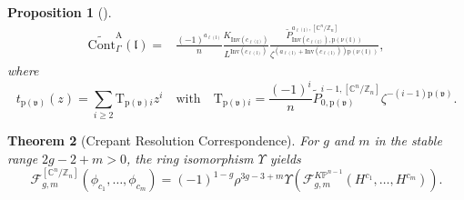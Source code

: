 \documentclass[12pt]{amsart}
\newtheorem{prop}{Proposition}[section]
\newtheorem{thm}[prop]{Theorem}
\numberwithin{equation}{section}
\newcommand{\CnZn}{[\mathbb{C}^n/\mathbb{Z}_n]}
\newcommand{\KP}{K\mathbb{P}}
\begin{document}
\begin{prop}[\cite{gt}]
\begin{equation*}
\begin{split}
    \widetilde{\mathrm{Cont}}_{\Gamma}^{\mathrm{A}}(\mathfrak{l})
    =&\frac{(-1)^{a_{\ell(\mathfrak{l})}}}{n}\frac{K_{\mathrm{Inv}(c_{\ell(\mathfrak{l})})}}{L^{\mathrm{Inv}(c_{\ell(\mathfrak{l})})}}
    \frac{\widetilde{P}_{\mathrm{Inv}(c_{\ell(\mathfrak{l})}),\mathrm{p}(\nu(\mathfrak{l}))}^{a_{\ell(\mathfrak{l})},\CnZn}}{     \zeta^{({a_{\ell(\mathfrak{l})}}+{\mathrm{Inv}(c_{\ell(\mathfrak{l})})})\mathrm{p}(\nu(\mathfrak{l}))}},
\end{split}
\end{equation*}
where
\begin{equation*}
t_{\mathrm{p}(\mathfrak{v})}(z)=\sum_{i\geq{2}}\mathrm{T}_{\mathrm{p}(\mathfrak{v})i}z^i\quad\text{with}\quad \mathrm{T}_{\mathrm{p}(\mathfrak{v})i}=\frac{(-1)^i}{n}\widetilde{P}_{0,\mathrm{p}(\mathfrak{v})}^{i-1,\CnZn}\zeta^{-(i-1)\mathrm{p}(\mathfrak{v})}.
\end{equation*}
\end{prop}



\begin{thm}[Crepant Resolution Correspondence]\label{thm:Main_Theorem}
For $g$ and $m$ in the stable range $2g-2+m>0$, the ring isomorphism $\Upsilon$ yields
\begin{equation*}
\mathcal{F}_{g, m}^{\CnZn}\left(\phi_{c_{1}}, \ldots, \phi_{c_{m}}\right)=(-1)^{1-g}\rho^{3g-3+m}\Upsilon \left(\mathcal{F}_{g, m}^{\KP^{n-1}}\left(H^{c_{1}}, \ldots, H^{c_{m}}\right)\right).
\end{equation*}
\end{thm}
\end{document}

